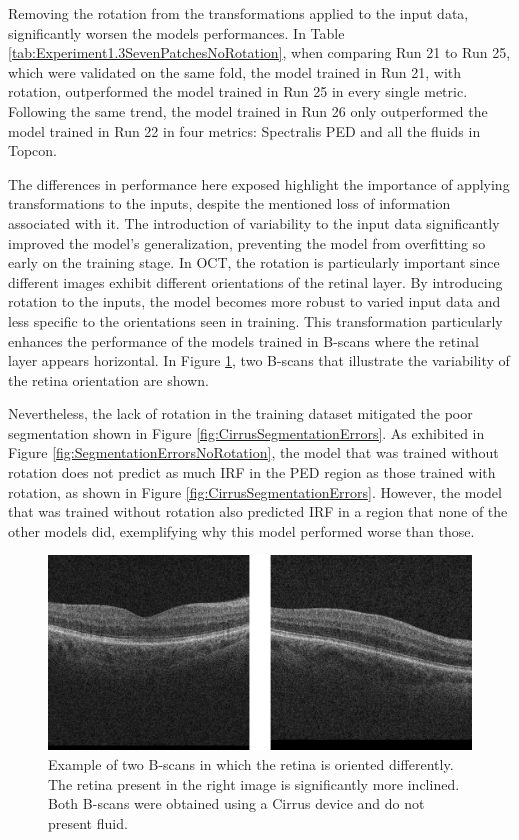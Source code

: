 Removing the rotation from the transformations applied to the input data, significantly worsen the models performances. In Table \ref{tab:Experiment1.3SevenPatchesNoRotation}, when comparing Run 21 to Run 25, which were validated on the same fold, the model trained in Run 21, with rotation, outperformed the model trained in Run 25 in every single metric. Following the same trend, the model trained in Run 26 only outperformed the model trained in Run 22 in four metrics: Spectralis PED and all the fluids in Topcon.
\par
The differences in performance here exposed highlight the importance of applying transformations to the inputs, despite the mentioned loss of information associated with it. The introduction of variability to the input data significantly improved the model's generalization, preventing the model from overfitting so early on the training stage. In OCT, the rotation is particularly important since different images exhibit different orientations of the retinal layer. By introducing rotation to the inputs, the model becomes more robust to varied input data and less specific to the orientations seen in training. This transformation particularly enhances the performance of the models trained in B-scans where the retinal layer appears horizontal. In Figure \ref{fig:DifferentRetinaOrientation}, two B-scans that illustrate the variability of the retina orientation are shown.
\par
Nevertheless, the lack of rotation in the training dataset mitigated the poor segmentation shown in Figure \ref{fig:CirrusSegmentationErrors}. As exhibited in Figure \ref{fig:SegmentationErrorsNoRotation}, the model that was trained without rotation does not predict as much IRF in the PED region as those trained with rotation, as shown in Figure \ref{fig:CirrusSegmentationErrors}. However, the model that was trained without rotation also predicted IRF in a region that none of the other models did, exemplifying why this model performed worse than those.

\begin{figure}[!ht]
	\centering
	\includegraphics[width=0.7\linewidth]{figures/DifferentRetinaOrientation.png}
	\caption{Example of two B-scans in which the retina is oriented differently. The retina present in the right image is significantly more inclined. Both B-scans were obtained using a Cirrus device and do not present fluid.}
	\label{fig:DifferentRetinaOrientation}
\end{figure}

